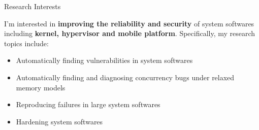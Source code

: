 \begin{rSection}{Research Interests}
\newcommand{\eg}{\textit{e}.\textit{g}.\xspace}

I'm interested in \textbf{improving the reliability and security} of
system softwares including \textbf{kernel, hypervisor and mobile
  platform}. Specifically, my research topics include:

\begin{itemize}[leftmargin=*,itemsep=-5pt]
\item{Automatically finding vulnerabilities in system softwares}
\item{Automatically finding and diagnosing concurrency bugs under relaxed memory models}
\item{Reproducing failures in large system softwares}
\item{Hardening system softwares}
\end{itemize}

\end{rSection}
